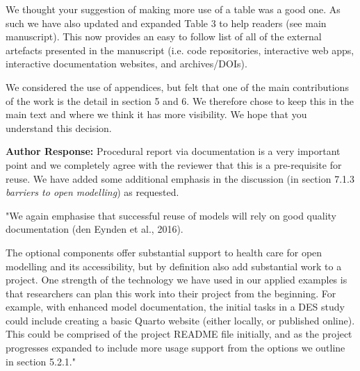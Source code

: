 \documentclass{article}
\begin{document}
We thought your suggestion of making more use of a table was a good one. As such we have also updated and expanded Table 3 to help readers (see main manuscript). This now provides an easy to follow list of all of the external artefacts presented in the manuscript (i.e. code repositories, interactive web apps, interactive documentation websites, and archives/DOIs).

We considered the use of appendices, but felt that one of the main contributions of the work is the detail in section 5 and 6. We therefore chose to keep this in the main text and where we think it has more visibility. We hope that you understand this decision.





\vspace{0.5cm}


\vspace{0.2cm}

\noindent\textbf{Author Response:} Procedural report via documentation is a very important point and we completely agree with the reviewer that this is a pre-requisite for reuse.  We have added some additional emphasis in the discussion  (in section 7.1.3 \textit{barriers to open modelling}) as requested.  


{\color{red}"We again emphasise that successful reuse of models will rely on good quality documentation (den Eynden et al., 2016). 

The optional components offer substantial support to health care for open modelling and its accessibility, but by definition also add substantial work to a project. One strength of the technology we have used in our applied examples is that researchers can plan this work into their project from the beginning. For example, with enhanced model documentation, the initial tasks in a DES study could include creating a basic Quarto website (either locally, or published online). This could be comprised of the project README file initially, and as the project progresses expanded to include more usage support from the options we outline in section 5.2.1."}
\end{document}
